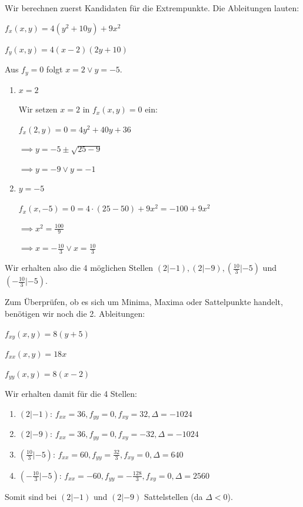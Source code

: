 \item

Wir berechnen zuerst Kandidaten für die Extrempunkte. Die Ableitungen lauten:

$f_x(x,y) = 4(y^2+10y)+9x^2$

$f_y(x,y) = 4(x-2)(2y+10)$

Aus $f_y = 0$ folgt $x=2 \lor y=-5$.

\begin{enumerate}
\item $x=2$

Wir setzen  $x=2$ in $f_x(x,y) = 0$ ein:

$f_x(2,y) = 0 = 4y^2+40y+36$

$\implies y = -5 \pm \sqrt{25-9}$

$\implies y = -9 \lor y = -1$

\item $y=-5$

$f_x(x,-5) = 0 = 4 \cdot (25-50)+9x^2 = -100+9x^2$

$\implies x^2 = \frac{100}{9}$

$\implies x=-\frac{10}{3} \lor x=\frac{10}{3}$

\end{enumerate}

Wir erhalten also die 4 möglichen Stellen $(2|-1), (2|-9), (\frac{10}{3}|-5)$ und $(-\frac{10}{3}|-5)$.

Zum Überprüfen, ob es sich um Minima, Maxima oder Sattelpunkte handelt, benötigen wir noch die 2. Ableitungen:

$f_{xy}(x,y) = 8(y+5)$

$f_{xx}(x,y) = 18x$

$f_{yy}(x,y) = 8(x-2)$

Wir erhalten damit für die 4 Stellen:

\begin{enumerate}
\item $(2|-1)$: $f_{xx}=36, f_{yy}=0, f_{xy}=32, \Delta = -1024$
\item $(2|-9)$: $f_{xx}=36, f_{yy}=0, f_{xy}=-32, \Delta = -1024$
\item $(\frac{10}{3}|-5)$: $f_{xx}=60, f_{yy}=\frac{32}{3}, f_{xy}=0, \Delta = 640$
\item $(-\frac{10}{3}|-5)$: $f_{xx}=-60, f_{yy}=-\frac{128}{3}, f_{xy}=0, \Delta = 2560$
\end{enumerate}

Somit sind bei $(2|-1)$ und $(2|-9)$ Sattelstellen (da $\Delta < 0$).

